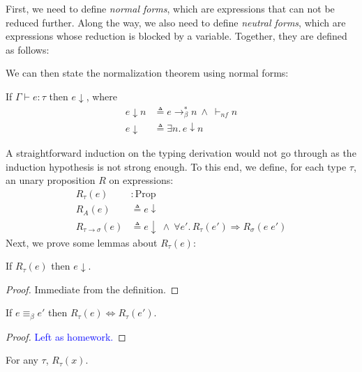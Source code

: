\documentclass{notes}
\begin{document}
First, we need to define \emph{normal forms}, which are expressions that can not be reduced further.
%
Along the way, we also need to define \emph{neutral forms}, which are expressions whose reduction is blocked by a variable.
%
Together, they are defined as follows:
%
%
We can then state the normalization theorem using normal forms:
%
\begin{thm}[Normalization]
  If $\Gamma \vdash e : \tau$ then $e \downarrow$, where
  \begin{align*}
    e \downarrow n & \triangleq e \longrightarrow_{\beta}^* n \ \wedge \ \vdash_{nf} n \\
    e \downarrow   & \triangleq \exists n.\, e \downarrow n
  \end{align*}
\end{thm}
%
\noindent A straightforward induction on the typing derivation would not go through as the induction hypothesis is not strong enough.
%
To this end, we define, for each type $\tau$, an unary proposition $R$ on expressions:
%
\begin{align*}
  R_{\tau}(e)                 & : \mathrm{Prop} \\
  R_{A}(e)                    & \triangleq e \downarrow \\
  R_{\tau \rightarrow \sigma}(e) & \triangleq e \downarrow \ \wedge \ \forall e'.\, R_{\tau}(e') \Longrightarrow R_{\sigma}(e \; e')
\end{align*}
Next, we prove some lemmas about $R_{\tau}(e)$:
%
\begin{lem} \label{lem1}
  If $R_{\tau}(e)$ then $e \downarrow$.
\end{lem}
%
\begin{proof}
  Immediate from the definition.
\end{proof}
%
\begin{lem}
  If $e \equiv_{\beta} e'$ then $R_{\tau}(e) \Longleftrightarrow R_{\tau}(e')$.
\end{lem}
%
\begin{proof}
  \textcolor{blue}{Left as homework.}
\end{proof}
%
\begin{lem} \label{lem3}
  For any $\tau$, $R_{\tau}(x)$.
\end{lem}
\end{document}
